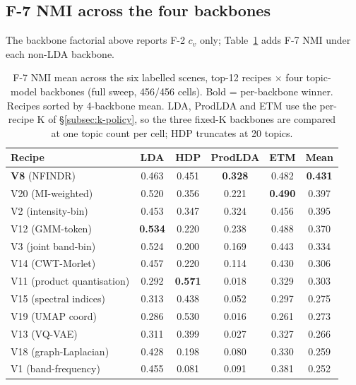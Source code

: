 \documentclass[journal,a4paper,10pt]{IEEEtran}
\begin{document}
\subsection{F-7 NMI across the four backbones}
\label{subsec:backbone-f7}

The backbone factorial above reports F-2 $c_v$ only;
Table~\ref{tab:f7-4backbone} adds F-7 NMI under each non-LDA backbone.

\begin{table}[ht]
\caption{F-7 NMI mean across the six labelled scenes, top-12 recipes
$\times$ four topic-model backbones (full sweep, 456/456 cells).
Bold = per-backbone winner. Recipes sorted by 4-backbone mean. LDA,
ProdLDA and ETM use the per-recipe K of \S\ref{subsec:k-policy}, so the
three fixed-K backbones are compared at one topic count per cell; HDP
truncates at 20 topics.}
\label{tab:f7-4backbone}
\centering
\scriptsize
\setlength{\tabcolsep}{4pt}
\begin{tabular}{lccccc}
\toprule
Recipe & LDA & HDP & ProdLDA & ETM & \textbf{Mean} \\
\midrule
\textbf{V8}  (NFINDR)       & 0.463 & 0.451 & \textbf{0.328} & 0.482 & \textbf{0.431} \\
V20 (MI-weighted)           & 0.520 & 0.356 & 0.221 & \textbf{0.490} & 0.397 \\
V2  (intensity-bin)         & 0.453 & 0.347 & 0.324 & 0.456 & 0.395 \\
V12 (GMM-token)             & \textbf{0.534} & 0.220 & 0.238 & 0.488 & 0.370 \\
V3  (joint band-bin)        & 0.524 & 0.200 & 0.169 & 0.443 & 0.334 \\
V14 (CWT-Morlet)            & 0.457 & 0.220 & 0.114 & 0.430 & 0.306 \\
V11 (product quantisation)  & 0.292 & \textbf{0.571} & 0.018 & 0.329 & 0.303 \\
V15 (spectral indices)      & 0.313 & 0.438 & 0.052 & 0.297 & 0.275 \\
V19 (UMAP coord)            & 0.286 & 0.530 & 0.016 & 0.261 & 0.273 \\
V13 (VQ-VAE)                & 0.311 & 0.399 & 0.027 & 0.327 & 0.266 \\
V18 (graph-Laplacian)       & 0.428 & 0.198 & 0.080 & 0.330 & 0.259 \\
V1  (band-frequency)        & 0.455 & 0.081 & 0.091 & 0.381 & 0.252 \\
\bottomrule
\end{tabular}
\end{table}
\end{document}

